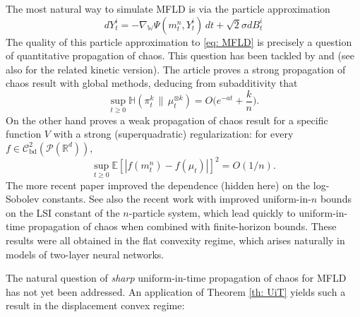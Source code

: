 \documentclass[11pt,reqno]{amsart}
\numberwithin{equation}{section}
\theoremstyle{definition}
\def\E{{\mathbb E}}
\def\R{{\mathbb R}}
\newcommand{\wgrad}{\nabla_{\W}}
\newcommand{\W}{\mathbb W}
\newcommand{\ent}{ \mathbb H}
\begin{document}
The most natural way to simulate MFLD is via the particle approximation
\begin{equation}
\label{eq: MFLD particles}
    dY_t^i=-\wgrad \Psi(m_t^n,Y_t^i)\,dt+\sqrt{2}\sigma dB_t^i
\end{equation}
The quality of this particle approximation to  \eqref{eq: MFLD} is precisely a question of quantitative propagation of chaos.
This question has been tackled by \cite{ChaosMFLD} and \cite{suzuki2023uniformintime} (see also \cite{ChaosKineticMFLD} for the related kinetic version). The article \cite{ChaosMFLD} proves a strong propagation of chaos result with global methods, deducing from subadditivity that
\begin{equation*}
    \sup_{t\geq 0}\ent (\pi_t^k \,\|\,\mu_t^{\otimes k}) = O \Big(e^{-at}+\frac kn \Big).
\end{equation*}
On the other hand \cite{suzuki2023uniformintime} proves a weak propagation of chaos result for a specific function $V$ with a strong (superquadratic) regularization: for every $f \in \mathcal C_{\text{bd}}^2(\mathcal P(\R^d)),$
\begin{equation*}
    \sup_{t\geq 0}\E[|f(m_t^n)-f(\mu_t)|]^2 = O(1/n).
\end{equation*}
The more recent paper \cite{nitanda2024improved} improved the dependence (hidden here) on the log-Sobolev constants. See also the recent work \cite{chewi2024uniform,wang2024uniform} with improved uniform-in-$n$ bounds on the LSI constant of the $n$-particle system, which lead quickly to uniform-in-time propagation of chaos when combined with finite-horizon bounds.
These results were all obtained in the flat convexity regime, which arises naturally in models of two-layer neural networks.

The natural  question of \emph{sharp} uniform-in-time propagation of chaos for MFLD has not yet been addressed.
An application of Theorem \ref{th: UiT} yields such a result in the displacement convex regime:
\end{document}
